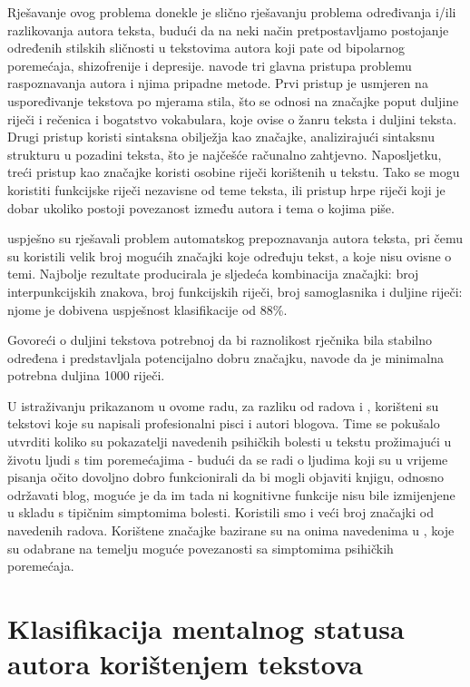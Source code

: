\documentclass[10pt, a4paper]{article}
\begin{document}
Rješavanje ovog problema donekle je slično rješavanju problema određivanja i/ili razlikovanja autora teksta, budući da na neki način pretpostavljamo postojanje određenih stilskih sličnosti u tekstovima autora koji pate od bipolarnog poremećaja, shizofrenije i depresije. \citet{coyotl} navode tri glavna pristupa problemu raspoznavanja autora i njima pripadne metode. Prvi pristup je usmjeren na uspoređivanje tekstova po mjerama stila, što se odnosi na značajke poput duljine riječi i rečenica i bogatstvo vokabulara, koje ovise o žanru teksta i duljini teksta. Drugi pristup koristi sintaksna obilježja kao značajke, analizirajući sintaksnu strukturu u pozadini teksta, što je najčešće računalno zahtjevno. Naposljetku, treći pristup kao značajke koristi osobine  riječi korištenih u tekstu. Tako se mogu koristiti funkcijske riječi nezavisne od teme teksta, ili pristup hrpe riječi koji je dobar ukoliko postoji povezanost između autora i tema o kojima piše.

\citet{kristo} uspješno su rješavali problem automatskog prepoznavanja autora teksta, pri čemu su koristili velik broj mogućih značajki koje određuju tekst, a koje nisu ovisne o temi. Najbolje rezultate producirala je sljedeća kombinacija značajki: broj interpunkcijskih znakova, broj funkcijskih riječi, broj samoglasnika i duljine riječi: njome je dobivena uspješnost klasifikacije od 88\%.

Govoreći o duljini tekstova potrebnoj da bi raznolikost rječnika bila stabilno određena i predstavljala potencijalno dobru značajku, \citet{tweedie} navode da je minimalna potrebna duljina 1000 riječi.

U istraživanju prikazanom u ovome radu, za razliku od radova \citep{strous-2009} i \citep{exray}, korišteni su tekstovi koje su napisali profesionalni pisci i autori blogova. Time se pokušalo utvrditi koliko su pokazatelji navedenih psihičkih bolesti u tekstu prožimajući u životu ljudi s tim poremećajima - budući da se radi o ljudima koji su u vrijeme pisanja očito dovoljno dobro funkcionirali da bi mogli objaviti knjigu, odnosno održavati blog, moguće je da im tada ni kognitivne funkcije nisu bile izmijenjene u skladu s tipičnim simptomima bolesti. Koristili smo i veći broj značajki od navedenih radova. Korištene značajke bazirane su na onima navedenima u \citep{kristo}, koje su odabrane na temelju moguće povezanosti sa simptomima psihičkih poremećaja.


\section{Klasifikacija mentalnog statusa autora korištenjem tekstova}
\end{document}
